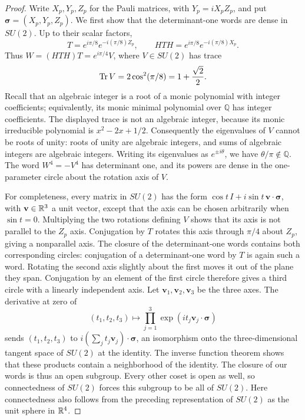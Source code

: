 \begin{proof}
Write $X_p,Y_p,Z_p$ for the Pauli matrices, with $Y_p=iX_pZ_p$, and put
$\boldsymbol\sigma=(X_p,Y_p,Z_p)$. We first show that the determinant-one
words are dense in $SU(2)$. Up to their scalar factors,
\[
 T=e^{i\pi/8}e^{-i(\pi/8)Z_p},\qquad
 HTH=e^{i\pi/8}e^{-i(\pi/8)X_p}.
\]
Thus $W=(HTH)T=e^{i\pi/4}V$, where $V\in SU(2)$ has trace
\[
 \operatorname{Tr} V=2\cos^2(\pi/8)=1+\frac{\sqrt2}{2}.
\]
Recall that an algebraic integer is a root of a monic polynomial with
integer coefficients; equivalently, its monic minimal polynomial over
$\mathbb Q$ has integer coefficients. The displayed trace is not an algebraic
integer, because its monic irreducible polynomial is $x^2-2x+1/2$.
Consequently the eigenvalues of $V$ cannot be roots of unity: roots of unity
are algebraic integers, and sums of algebraic integers are algebraic integers.
Writing its eigenvalues as $e^{\pm i\theta}$, we have
$\theta/\pi\notin\mathbb Q$. The word $W^4=-V^4$ has determinant one,
and its powers are dense in the one-parameter circle about the rotation
axis of $V$.

For completeness, every matrix in $SU(2)$ has the form
$\cos t\,I+i\sin t\,\mathbf v\cdot\boldsymbol\sigma$, with
$\mathbf v\in\mathbb R^3$ a unit vector, except that the axis can be chosen
arbitrarily when $\sin t=0$. Multiplying the two rotations defining $V$
shows that its axis is not parallel to the $Z_p$ axis. Conjugation by $T$
rotates this axis through $\pi/4$ about $Z_p$, giving a nonparallel axis.
The closure of the determinant-one words contains both corresponding
circles: conjugation of a determinant-one word by $T$ is again such a word.
Rotating the second axis slightly about the first moves it out of the
plane they span. Conjugation by an element of the first circle therefore
gives a third circle with a linearly independent axis.
Let $\mathbf v_1,\mathbf v_2,\mathbf v_3$ be the three axes. The derivative
at zero of
\[
 (t_1,t_2,t_3)\longmapsto
 \prod_{j=1}^3\exp(i t_j\mathbf v_j\cdot\boldsymbol\sigma)
\]
sends $(t_1,t_2,t_3)$ to
$i(\sum_jt_j\mathbf v_j)\cdot\boldsymbol\sigma$, an isomorphism onto the
three-dimensional tangent space of $SU(2)$ at the identity. The inverse
function theorem shows that these products contain a neighborhood of the
identity. The closure of our words is thus an open subgroup. Every other
coset is open as well, so connectedness of $SU(2)$ forces this subgroup to
be all of $SU(2)$. Here connectedness also follows from the preceding
representation of $SU(2)$ as the unit sphere in $\mathbb R^4$.


\end{proof}
